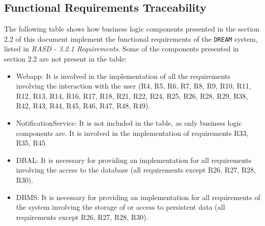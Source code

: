 \documentclass{article}
\begin{document}
\subsection{Functional Requirements Traceability}
The following table shows how business logic components presented in the section  2.2 of this document implement the functional requirements of the \verb|DREAM| system, listed in \textit{RASD - 3.2.1 Requirements}.
\newline
Some of the components presented in section 2.2 are not present in the table:
\begin{itemize}
    \item Webapp: It is involved in the implementation of all the requirements involving the interaction with the user (R4, R5, R6, R7, R8, R9, R10, R11, R12, R13, R14, R16, R17, R18, R21, R22, R24, R25, R26, R28, R29, R38, R42, R43, R44, R45, R46, R47, R48, R49).
    \item NotificationService: It is not included in the table, as only business logic components are. It is involved in the implementation of requirements R33, R35, R45.
    \item DBAL: It is necessary for providing an implementation for all requirements involving the access to the database (all requirements except R26, R27, R28, R30).
    \item DBMS: It is necessary for providing an implementation for all requirements of the system involving the storage of or access to persistent data (all requirements except R26, R27, R28, R30).
\end{itemize}
\end{document}
